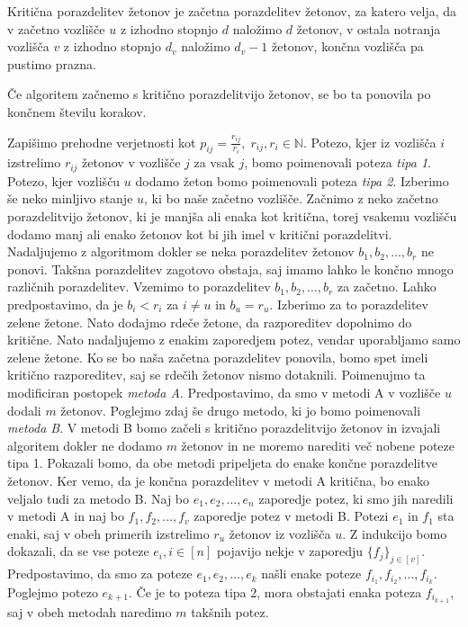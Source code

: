 \documentclass[twoside,11pt]{article}
\begin{document}
\begin{definicija}\label{kritična porazdelitev}
    Kritična porazdelitev žetonov je začetna porazdelitev žetonov, za katero velja, da v začetno vozlišče $u$ z izhodno stopnjo $d$ naložimo $d$ žetonov, v ostala notranja vozlišča $v$ z izhodno stopnjo $d_{v}$ naložimo $d_{v} - 1$ žetonov, končna vozlišča pa pustimo prazna.
\end{definicija}

\begin{trditev}\label{končnost}
    Če algoritem začnemo s kritično porazdelitvijo žetonov, se bo ta ponovila po končnem številu korakov.
\end{trditev}

 Zapišimo prehodne verjetnosti kot $p_{ij} = \frac{r_{ij}}{r_{i}},\; r_{ij}, r_{i}\in \mathbb{N}$. Potezo, kjer iz vozlišča $i$ izstrelimo $r_{ij}$ žetonov v vozlišče $j$ za vsak $j$, bomo poimenovali poteza \emph{tipa 1}. Potezo, kjer vozlišču $u$ dodamo žeton bomo poimenovali poteza \emph{tipa 2}. Izberimo še neko minljivo stanje $u$, ki bo naše začetno vozlišče. Začnimo z neko začetno porazdelitvijo žetonov, ki je manjša ali enaka kot kritična, torej vsakemu vozlišču dodamo manj ali enako žetonov kot bi jih imel v kritični porazdelitvi. Nadaljujemo z algoritmom dokler se neka porazdelitev žetonov $b_{1},b_{2},\ldots,b_{r}$ ne ponovi. Takšna porazdelitev zagotovo obstaja, saj imamo lahko le končno mnogo različnih porazdelitev. Vzemimo to porazdelitev $b_{1},b_{2},\ldots,b_{r}$ za začetno. Lahko predpostavimo, da je $b_{i}<r_{i}$ za $i \neq u$ in $b_{u} = r_{u}$. Izberimo za to porazdelitev zelene žetone. Nato dodajmo rdeče žetone, da razporeditev dopolnimo do kritične. Nato nadaljujemo z enakim zaporedjem potez, vendar uporabljamo samo zelene žetone. Ko se bo naša začetna porazdelitev ponovila, bomo spet imeli kritično razporeditev, saj se rdečih žetonov nismo dotaknili. Poimenujmo ta modificiran postopek \emph{metoda A}. 
Predpostavimo, da smo v metodi A v vozlišče $u$ dodali $m$ žetonov. Poglejmo zdaj še drugo metodo, ki jo bomo poimenovali \emph{metoda B}. V metodi B bomo začeli s kritično porazdelitvijo žetonov in izvajali algoritem dokler ne dodamo $m$ žetonov in ne moremo narediti več nobene poteze tipa 1. Pokazali bomo, da obe metodi pripeljeta do enake končne porazdelitve žetonov. Ker vemo, da je končna porazdelitev v metodi A kritična, bo enako veljalo tudi za metodo B. \newline
\indent Naj bo $e_{1},e_{2},\ldots,e_{n}$ zaporedje potez, ki smo jih naredili v metodi A in naj bo $f_{1},f_{2},\ldots,f_{v}$ zaporedje potez v metodi B. Potezi $e_{1}$ in $f_{1}$ sta enaki, saj v obeh primerih izstrelimo $r_{u}$ žetonov iz vozlišča $u$. Z indukcijo bomo dokazali, da se vse poteze $e_{i}, i \in [n] $ pojavijo nekje v zaporedju $\{ f_{j}\} _{j\in [v] }$. Predpostavimo, da smo za poteze $e_{1},e_{2},\ldots,e_{k}$ našli enake poteze $f_{i_1},f_{i_2},\ldots,f_{i_k}$. Poglejmo potezo $e_{k+1}$. Če je to poteza tipa 2, mora obstajati enaka poteza $f_{i_{k+1}}$, saj v obeh metodah naredimo $m$ takšnih potez.
\end{document}
